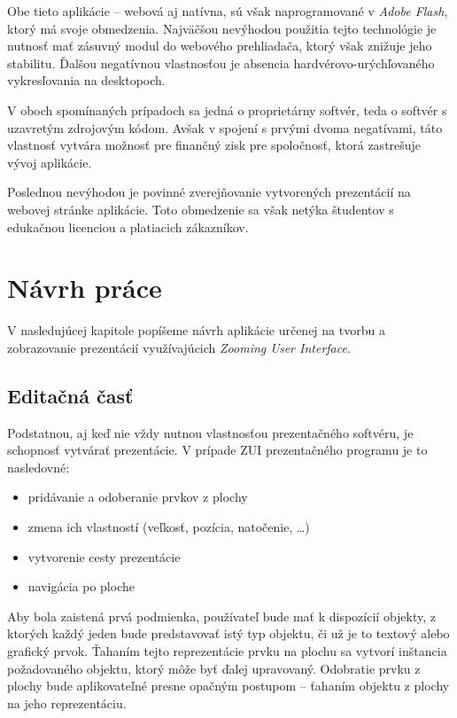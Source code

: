 Obe tieto aplikácie -- webová aj natívna, sú však naprogramované v \textit{Adobe Flash}, ktorý má svoje obmedzenia. Najväčšou nevýhodou použitia tejto technológie je nutnosť mať zásuvný modul do webového prehliadača, ktorý však znižuje jeho stabilitu. Ďalšou negatívnou vlastnosťou je absencia hardvérovo-urýchľovaného vykresľovania na desktopoch.

V oboch spomínaných prípadoch sa jedná o proprietárny softvér, teda o softvér s uzavretým zdrojovým kódom. Avšak v spojení s prvými dvoma negatívami, táto vlastnosť vytvára možnosť pre finančný zisk pre spoločnosť, ktorá zastrešuje vývoj aplikácie.

Poslednou nevýhodou je povinné zverejňovanie vytvorených prezentácií na webovej stránke aplikácie. Toto obmedzenie sa však netýka študentov s edukačnou licenciou a platiacich zákazníkov.

\chapter{Návrh práce} \label{ch:navrh}

V nasledujúcej kapitole popíšeme návrh aplikácie určenej na tvorbu a zobrazovanie prezentácií využívajúcich \textit{Zooming User Interface}.

\section{Editačná časť}

Podstatnou, aj keď nie vždy nutnou vlastnosťou prezentačného softvéru, je schopnosť vytvárať prezentácie. V prípade ZUI prezentačného programu je to nasledovné:

\begin{itemize}
 \item pridávanie a odoberanie prvkov z plochy
 \item zmena ich vlastností (veľkosť, pozícia, natočenie, \dots)
 \item vytvorenie cesty prezentácie
 \item navigácia po ploche
\end{itemize}

Aby bola zaistená prvá podmienka, používateľ bude mať k dispozícií objekty, z ktorých každý jeden bude predstavovať istý typ objektu, či už je to textový alebo grafický prvok. Ťahaním tejto reprezentácie prvku na plochu sa vytvorí inštancia požadovaného objektu, ktorý môže byť ďalej upravovaný. Odobratie prvku z plochy bude aplikovateľné presne opačným postupom -- ťahaním objektu z plochy na jeho reprezentáciu.

